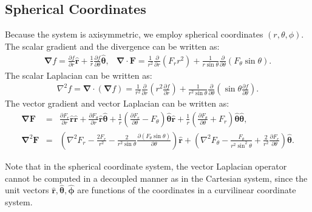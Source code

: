 \documentclass[10pt]{ijnam}
\newcommand{\deriv}[2]{\frac{\partial #1}{\partial #2}}
\newcommand{\pars}[1]{\left(#1\right)}
\newcommand\Laplacian{\nabla^2}
\newcommand\bnabla{\boldsymbol{\nabla}}
\newcommand\bLaplacian{\boldsymbol{\nabla}^2}
\newcommand\bF{\boldsymbol{F}}
\newcommand\br{\boldsymbol{r}}
\newcommand\brhat{\hat{\br}}
\newcommand\btheta{\boldsymbol{\theta}}
\newcommand\bthetahat{\hat{\btheta}}
\newcommand\bphi{\boldsymbol{\phi}}
\newcommand\bphihat{\hat{\bphi}}
\begin{document}
\subsection{Spherical Coordinates}
Because the system is axisymmetric, we employ
spherical coordinates $(r,\theta,\phi)$.
The scalar gradient and the divergence can be written as:
\begin{eqnarray}
\bnabla f = \deriv{f}{r}\brhat + \frac{1}{r}\deriv{f}{\theta}\bthetahat, &
\bnabla \cdot \bF = \frac{1}{r^2}\deriv{}{r}\pars{F_r r^2 } + 
               \frac{1}{r \sin\theta}\deriv{}{\theta}\pars{F_\theta \sin\theta}.
\end{eqnarray}
The scalar Laplacian can be written as:
\begin{eqnarray}
\Laplacian f = \bnabla \cdot (\bnabla f) = 
 \frac{1}{r^2}\deriv{}{r}\pars{r^2 \deriv{f}{r}} + 
 \frac{1}{r^2 \sin\theta}\deriv{}{\theta}\pars{\sin\theta \deriv{f}{\theta}}.
\end{eqnarray}
The vector gradient and vector Laplacian can be written as:
\begin{eqnarray}
\bnabla \bF &=& \deriv{F_r}{r} \brhat \brhat + \deriv{F_\theta}{r} \brhat \bthetahat + 
\frac{1}{r}\pars{\deriv{F_r}{\theta} - F_\theta} \bthetahat \brhat + 
\frac{1}{r}\pars{\deriv{F_\theta}{\theta} + F_r} \bthetahat \bthetahat, \\
\bLaplacian \bF &=& 
\left(\Laplacian F_r - \frac{2F_r}{r^2} - 
\frac{2}{r^2 \sin\theta} \deriv{\left(F_\theta \sin\theta \right)}{\theta}\right)\brhat
+ \left(\Laplacian F_\theta - \frac{F_\theta}{r^2 \sin^2\theta} + 
\frac{2}{r^2}\deriv{F_r}{\theta}\right) \bthetahat.
\end{eqnarray}

Note that in the spherical coordinate system,
the vector Laplacian operator cannot be computed in a decoupled manner as in the Cartesian system,
since the unit vectors $\brhat, \bthetahat, \bphihat$ are functions of the coordinates
in a curvilinear coordinate system.
\end{document}
